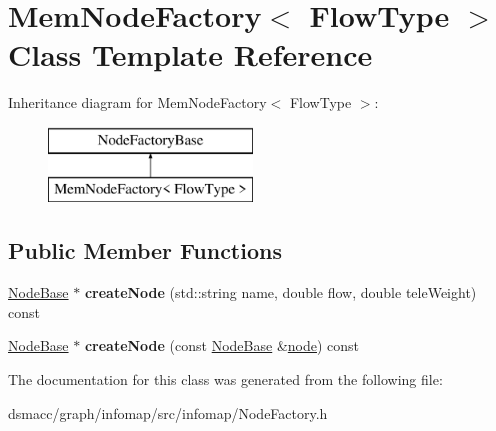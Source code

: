 \hypertarget{classMemNodeFactory}{}\section{Mem\+Node\+Factory$<$ Flow\+Type $>$ Class Template Reference}
\label{classMemNodeFactory}
Inheritance diagram for Mem\+Node\+Factory$<$ Flow\+Type $>$\+:\begin{figure}[H]
\begin{center}
\leavevmode
\includegraphics[height=2.000000cm]{classMemNodeFactory}
\end{center}
\end{figure}
\subsection*{Public Member Functions}
\begin{DoxyCompactItemize}
\item 
\mbox{\label{classMemNodeFactory_afb516d47852fe5e1d03737fae4827027}} 
\mbox{\hyperlink{classNodeBase}{Node\+Base}} $\ast$ {\bfseries create\+Node} (std\+::string name, double flow, double tele\+Weight) const
\item 
\mbox{\label{classMemNodeFactory_a30b6c54164626c1f74d69623c0ec9e3c}} 
\mbox{\hyperlink{classNodeBase}{Node\+Base}} $\ast$ {\bfseries create\+Node} (const \mbox{\hyperlink{classNodeBase}{Node\+Base}} \&\mbox{\hyperlink{structnode}{node}}) const
\end{DoxyCompactItemize}


The documentation for this class was generated from the following file\+:\begin{DoxyCompactItemize}
\item 
dsmacc/graph/infomap/src/infomap/Node\+Factory.\+h\end{DoxyCompactItemize}
